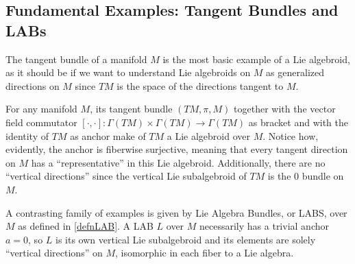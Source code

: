 \subsection{Fundamental Examples: Tangent Bundles and LABs}

The tangent bundle of a manifold $M$ is the most basic example of a Lie algebroid, as it should be if we want to understand Lie algebroids on $M$ as generalized directions on $M$ since $TM$ is the space of the directions tangent to $M$.

For any manifold $M$, its tangent bundle $(TM, \pi, M)$ together with the vector field commutator $[\cdot , \cdot]: \Gamma(TM) \times \Gamma(TM) \to \Gamma(TM)$ as bracket and with the identity of $TM$ as anchor make of $TM$ a Lie algebroid over $M$. Notice how, evidently, the anchor is fiberwise surjective, meaning that every tangent direction on $M$ has a ``representative'' in this Lie algebroid. Additionally, there are no ``vertical directions'' since the vertical Lie subalgebroid of $TM$ is the $0$ bundle on $M$.

A contrasting family of examples is given by Lie Algebra Bundles, or LABS, over $M$ as defined in \ref{defnLAB}. A LAB $L$ over $M$ necessarily has a trivial anchor $a = 0$, so $L$ is its own vertical Lie subalgebroid and its elements are solely ``vertical directions'' on $M$, isomorphic in each fiber to a Lie algebra.






